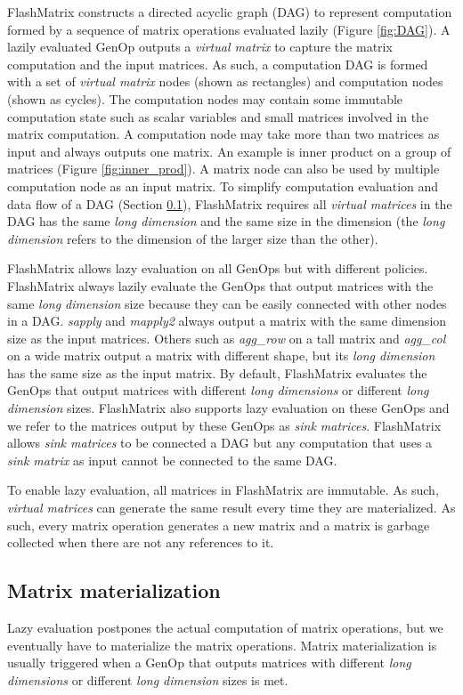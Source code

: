 FlashMatrix constructs a directed acyclic graph (DAG) \cite{} to represent
computation formed by a sequence of matrix operations evaluated lazily
(Figure \ref{fig:DAG}). A lazily evaluated GenOp outputs a \textit{virtual matrix}
to capture the matrix computation and the input matrices. As such, a computation
DAG is formed with a set of \textit{virtual matrix} nodes (shown as rectangles)
and computation nodes (shown as cycles).
The computation nodes may contain some immutable computation state such as
scalar variables and small matrices involved in the matrix computation.
A computation node may take more than two matrices as input and always outputs
one matrix. An example is inner product on a group of matrices (Figure
\ref{fig:inner_prod}). A matrix node can also be used by multiple computation
node as an input matrix.
To simplify computation evaluation and data flow of a DAG (Section
\ref{sec:materialize}), FlashMatrix requires all \textit{virtual matrices} in
the DAG has the same \textit{long dimension} and the same size in the dimension
(the \textit{long dimension} refers to the dimension of the larger size than
the other).

FlashMatrix allows lazy evaluation on all GenOps but with different policies.
FlashMatrix always lazily evaluate the GenOps that output matrices with
the same \textit{long dimension} size because they can be easily connected
with other nodes in a DAG. \textit{sapply} and \textit{mapply2} always
output a matrix with the same dimension size as the input matrices. Others such
as \textit{agg\_row} on a tall matrix and \textit{agg\_col} on a wide matrix output
a matrix with different shape, but its \textit{long dimension} has the same size
as the input matrix. By default, FlashMatrix evaluates the GenOps that output
matrices with different \textit{long dimensions} or different \textit{long dimension}
sizes. FlashMatrix also supports lazy evaluation on these GenOps and we refer to
the matrices output by these GenOps as \textit{sink matrices}.
FlashMatrix allows \textit{sink matrices} to be connected a DAG but any computation
that uses a \textit{sink matrix} as input cannot be connected to the same DAG.

To enable lazy evaluation, all matrices in FlashMatrix are immutable.
As such, \textit{virtual matrices} can generate the same result every time
they are materialized. As such, every matrix operation generates a new matrix
and a matrix is garbage collected when there are not any references to it.

\subsection{Matrix materialization} \label{sec:materialize}
Lazy evaluation postpones the actual computation of matrix operations, but we
eventually have to materialize the matrix operations. Matrix materialization
is usually triggered when a GenOp that outputs matrices with different
\textit{long dimensions} or different \textit{long dimension} sizes is met.

